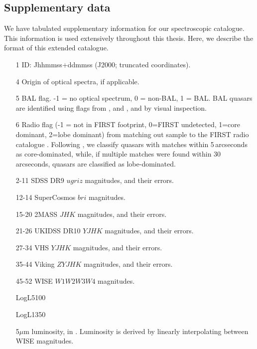 \subsection{Supplementary data}

We have tabulated supplementary information for our spectroscopic catalogue.
This information is used extensively throughout this thesis. 
Here, we describe the format of this extended catalogue. 

\begin{itemize}

\item[1] ID: Jhhmmss+ddmmss (J2000; truncated coordinates). 

\item[4] Origin of optical spectra, if applicable. 

\item[5] BAL flag. -1 = no optical spectrum, 0 = non-BAL, 1 = BAL. BAL quasars are identified using flags from \citet{shen11}, \citet{allen11} and \citet{paris17}, and by visual inspection. 

\item[6] Radio flag (-1 = not in FIRST footprint, 0=FIRST undetected, 1=core dominant, 2=lobe dominant) from matching out sample to the FIRST radio catalogue \citep{white97}. Following \citet{shen11}, we classify quasars with matches within 5\,arcseconds as core-dominated, while, if multiple matches were found within 30 arcseconds, quasars are classified as lobe-dominated. 
  
\item[2-11] SDSS DR9 $ugriz$ magnitudes, and their errors. 

\item[12-14] SuperCosmos $bri$ magnitudes. 

\item[15-20] 2MASS $JHK$ magnitudes, and their errors. 

\item[21-26] UKIDSS DR10 $YJHK$ magnitudes, and their errors. 

\item[27-34] VHS $YJHK$ magnitudes, and their errors. 

\item[35-44] Viking $ZYJHK$ magnitudes, and their errors. 

\item[45-52] WISE $W1W2W3W4$ magnitudes. 

\item[] LogL5100

\item[] LogL1350

\item[] 5$\mu$m luminosity, in \ergs. Luminosity is derived by linearly interpolating between WISE magnitudes. 

\end{itemize}



 

